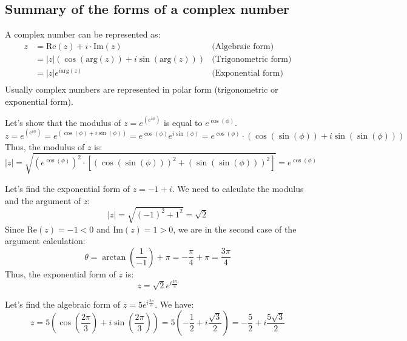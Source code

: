 \subsection{Summary of the forms of a complex number}
A complex number can be represented as:
\begin{align*}
    z &= \text{Re}(z) + i \cdot \text{Im}(z) &\text{(Algebraic form)} \\
    &= |z|(\cos(\text{arg}(z)) + i \sin(\text{arg}(z))) &\text{(Trigonometric form)} \\
    &= |z| e^{i \text{arg}(z)} &\text{(Exponential form)} \\
\end{align*}
Usually complex numbers are represented in polar form (trigonometric or exponential form).
\begin{eg}
    Let's show that the modulus of $z = e^{(e^{i \phi})}$ is equal to $e^{\cos(\phi)}$.
    \[
        z = e^{(e^{i \phi})} = e^{(\cos(\phi) + i \sin(\phi))} = e^{\cos(\phi)} e^{i \sin(\phi)} = e^{\cos(\phi)} \cdot (\cos(\sin(\phi)) + i \sin(\sin(\phi)))
    \]
    Thus, the modulus of $z$ is:
    \[
        |z| = \sqrt{(e^{\cos(\phi)})^2 \cdot [(\cos(\sin(\phi)))^2 + (\sin(\sin(\phi)))^2]} = e^{\cos(\phi)}
    \]
\end{eg}

\begin{eg}
    Let's find the exponential form of $z = -1 + i$. We need to calculate the modulus and the argument of $z$:
    \[
        |z| = \sqrt{(-1)^2 + 1^2} = \sqrt{2}
    \]
    Since $\text{Re}(z) = -1 < 0$ and $\text{Im}(z) = 1 > 0$, we are in the second case of the argument calculation:
    \[
        \theta = \arctan\left(\frac{1}{-1}\right) + \pi = -\frac{\pi}{4} + \pi = \frac{3\pi}{4}
    \]
    Thus, the exponential form of $z$ is:
    \[
        z = \sqrt{2} e^{i \frac{3\pi}{4}}
    \]
\end{eg}

\begin{eg}
    Let's find the algebraic form of $z = 5 e^{i \frac{2\pi}{3}}$. We have:
    \[
        z = 5 \left( \cos\left(\frac{2\pi}{3}\right) + i \sin\left(\frac{2\pi}{3}\right) \right) = 5 \left( -\frac{1}{2} + i \frac{\sqrt{3}}{2} \right) = -\frac{5}{2} + i \frac{5\sqrt{3}}{2}
    \]
\end{eg}

